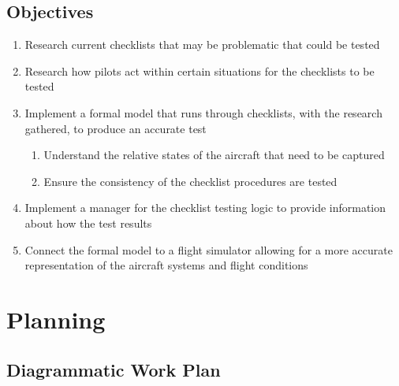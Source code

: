 \documentclass[a4paper]{article}
\begin{document}
\subsection*{Objectives}
\begin{enumerate}
  \item Research current checklists that may be problematic that 
    could be tested
  \item Research how pilots act within certain situations for 
    the checklists to be tested
  \item Implement a formal model that runs through checklists,
    with the research gathered, to produce an accurate test
    \begin{enumerate}
      \item Understand the relative states of the aircraft that 
        need to be captured
      \item Ensure the consistency of the checklist procedures 
        are tested
    \end{enumerate}
  \item Implement a manager for the checklist testing logic to 
    provide information about how the test results
  \item Connect the formal model to a flight simulator allowing
    for a more accurate representation of the aircraft systems
    and flight conditions
\end{enumerate}

\section{Planning}
\subsection{Diagrammatic Work Plan}

\end{document}

